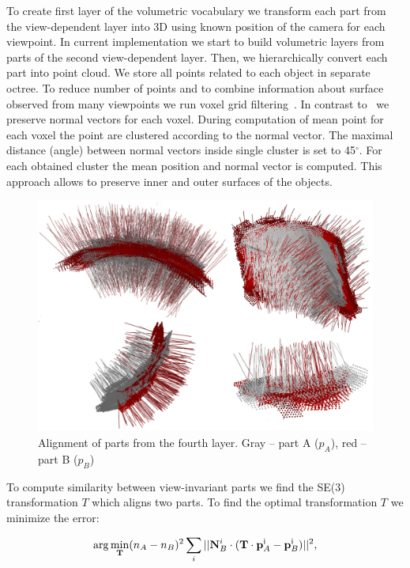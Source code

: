 \documentclass[letterpaper,10pt,conference]{ieeeconf}  %
\begin{document}
To create first layer of the volumetric vocabulary we transform each part from the view-dependent layer into 3D using known position of the camera for each viewpoint. In current implementation we start to build volumetric layers from parts of the second view-dependent layer. Then, we hierarchically convert each part into point cloud. We store all points related to each object in separate octree. To reduce number of points and to combine information about surface observed from many viewpoints we run voxel grid filtering~\cite{Aldoma2012}. In contrast to~\cite{Aldoma2012} we preserve normal vectors for each voxel. During computation of mean point for each voxel the point are clustered according to the normal vector. The maximal distance (angle) between normal vectors inside single cluster is set to 45$^\circ$. For each obtained cluster the mean position and normal vector is computed. This approach allows to preserve inner and outer surfaces of the objects.

\begin{figure}[t]
 \centering
\includegraphics[width=0.95\columnwidth]{../images/viParts.eps}
\caption{Alignment of parts from the fourth layer. Gray -- part A ($p_A$), red -- part B ($p_B$)}
 \label{viParts}
\end{figure}

To compute similarity between view-invariant parts we find the SE(3) transformation $T$ which aligns two parts. To find the optimal transformation $T$ we minimize the error:

\begin{equation}
\label{optVol}
 \arg\min_{\bf T} (n_A-n_B)^2 \sum_i ||{\bf N}_B^i \cdot ({\bf T}\cdot {\bf p}_A^{\rm i}-{\bf p}_B^{\rm i})||^2,
\end{equation}
\end{document}
